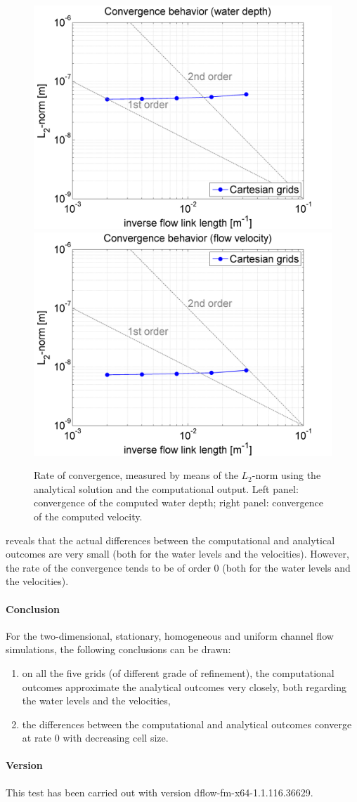 \begin{figure}[h!]
\begin{center}
\includegraphics[width=0.48\columnwidth]{figures/hchannelconvergence.png}
\includegraphics[width=0.48\columnwidth]{figures/uchannelconvergence.png}
\end{center}\caption{Rate of convergence, measured by means of the $L_2$-norm using the analytical solution and the computational output. Left panel: convergence of the computed water depth; right panel: convergence of the computed velocity. \label{fig:chezysquaresconvergence}}
\end{figure}

 reveals that the actual differences between the computational and analytical outcomes are very small (both for the water levels and the velocities). However, the rate of the convergence tends to be of order 0 (both for the water levels and the velocities).



\paragraph*{Conclusion}
For the two-dimensional, stationary, homogeneous and uniform channel flow simulations, the following conclusions can be drawn:
\begin{enumerate}
\item on all the five grids (of different grade of refinement), the computational outcomes approximate the analytical outcomes very closely, both regarding the water levels and the velocities,
\item the differences between the computational and analytical outcomes converge at rate 0 with decreasing cell size.
\end{enumerate}



\paragraph*{Version}
This test has been carried out with version dflow-fm-x64-1.1.116.36629.


